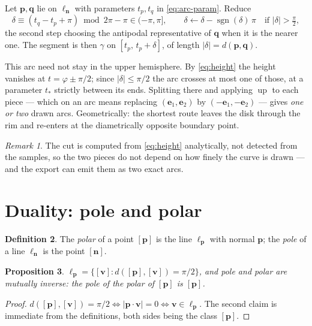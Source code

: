 \documentclass[11pt,a4paper]{article}
\newcommand{\nvec}{\mathbf{n}}
\newcommand{\vv}{\mathbf{v}}
\newcommand{\ee}{\mathbf{e}}
\newcommand{\pp}{\mathbf{p}}
\newcommand{\qq}{\mathbf{q}}
\newcommand{\abs}[1]{\lvert #1 \rvert}
\theoremstyle{plain}
\newtheorem{proposition}{Proposition}[section]
\theoremstyle{definition}
\newtheorem{definition}[proposition]{Definition}
\theoremstyle{remark}
\newtheorem{remark}[proposition]{Remark}
\begin{document}
Let $\pp,\qq$ lie on $\ell_\nvec$ with parameters $t_p,t_q$ in
\eqref{eq:arc-param}. Reduce
\begin{equation}
  \delta \equiv (t_q-t_p+\pi)\bmod 2\pi-\pi\in(-\pi,\pi],
  \qquad
  \delta \leftarrow \delta-\operatorname{sgn}(\delta)\,\pi
  \quad\text{if } \abs{\delta}>\tfrac{\pi}{2},
\end{equation}
the second step choosing the antipodal representative of $\qq$ when it is the
nearer one. The segment is then $\gamma$ on $[t_p,\,t_p+\delta]$, of length
$\abs{\delta}=d(\pp,\qq)$.

This arc need not stay in the upper hemisphere. By \eqref{eq:height} the height
vanishes at $t=\varphi\pm\pi/2$; since $\abs{\delta}\le\pi/2$ the arc crosses at
most one of those, at a parameter $t_\ast$ strictly between its ends. Splitting
there and applying $\operatorname{up}$ to each piece --- which on an arc means
replacing $(\ee_1,\ee_2)$ by $(-\ee_1,-\ee_2)$ --- gives \emph{one or two} drawn
arcs. Geometrically: the shortest route leaves the disk through the rim and
re-enters at the diametrically opposite boundary point.

\begin{remark}
The cut is computed from \eqref{eq:height} analytically, not detected from the
samples, so the two pieces do not depend on how finely the curve is drawn ---
and the export can emit them as two exact arcs.
\end{remark}

\section{Duality: pole and polar}
\label{sec:duality}

\begin{definition}
The \emph{polar} of a point $[\pp]$ is the line $\ell_{\pp}$ with normal $\pp$;
the \emph{pole} of a line $\ell_\nvec$ is the point $[\nvec]$.
\end{definition}

\begin{proposition}
$\ell_\pp=\{[\vv] : d([\pp],[\vv])=\pi/2\}$, and pole and polar are mutually
inverse: the pole of the polar of $[\pp]$ is $[\pp]$.
\end{proposition}

\begin{proof}
$d([\pp],[\vv])=\pi/2\iff\abs{\pp\cdot\vv}=0\iff\vv\in\ell_\pp$. The second claim
is immediate from the definitions, both sides being the class $[\pp]$.
\end{proof}
\end{document}
